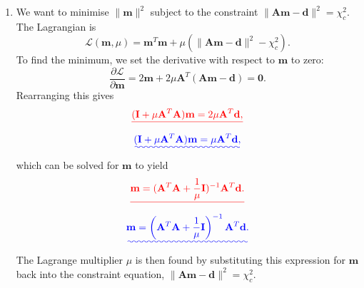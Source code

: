 \documentclass[a4paper,10pt]{paper}
\providecommand{\DIFadd}[1]{{\protect\color{blue}\uwave{#1}}} %
\providecommand{\DIFdel}[1]{{\protect\color{red}\sout{#1}}}                      %
\providecommand{\DIFaddbegin}{} %
\providecommand{\DIFaddend}{} %
\providecommand{\DIFdelbegin}{} %
\providecommand{\DIFdelend}{} %
\begin{document}
\begin{enumerate}
\begin{enumerate}
    \item We want to minimise $\|\mathbf{m}\|^{2}$ subject to the constraint $\|\mathbf{A}\mathbf{m}-\mathbf{d}\|^{2} = \chi^{2}_{c}$. The Lagrangian is
    \begin{equation*}
        \mathcal{L}(\mathbf{m},\mu)=\mathbf{m}^{T}\mathbf{m}+\mu(\|\mathbf{A}\mathbf{m}-\mathbf{d}\|^{2}-\chi^{2}_{c}).
    \end{equation*}
    To find the minimum, we set the derivative with respect to $\mathbf{m}$ to zero:
    \begin{equation*}
        \frac{\partial\mathcal{L}}{\partial\mathbf{m}} = 2\mathbf{m}+2\mu\mathbf{A}^{T}(\mathbf{A}\mathbf{m}-\mathbf{d}) = \mathbf{0}.
    \end{equation*}
    Rearranging this gives
    \DIFdelbegin \begin{displaymath}
        \DIFdel{(\mathbf{I}+\mu\mathbf{A}^{T}\mathbf{A})\mathbf{m}=2\mu\mathbf{A}^{T}\mathbf{d},
    }\end{displaymath}%
\DIFdelend \DIFaddbegin \begin{equation*}
        \DIFadd{(\mathbf{I}+\mu\mathbf{A}^{T}\mathbf{A})\mathbf{m}=\mu\mathbf{A}^{T}\mathbf{d},
    }\end{equation*}\DIFaddend 
    which can be solved for $\mathbf{m}$ to yield
    \DIFdelbegin \begin{displaymath}
        \DIFdel{\mathbf{m}=( \mathbf{A}^{T}\mathbf{A} + \frac{1}{\mu}\mathbf{I})^{-1}\mathbf{A}^{T}\mathbf{d}.
    }\end{displaymath}%
\DIFdelend \DIFaddbegin \begin{equation*}
        \DIFadd{\mathbf{m}=\left( \mathbf{A}^{T}\mathbf{A} + \frac{1}{\mu}\mathbf{I}\right)^{-1}\mathbf{A}^{T}\mathbf{d}.
    }\end{equation*}\DIFaddend 
    The Lagrange multiplier $\mu$ is then found by substituting this expression for $\mathbf{m}$ back into the constraint equation, $\|\mathbf{A}\mathbf{m}-\mathbf{d}\|^{2} = \chi^{2}_{c}$.


\end{enumerate}
\end{enumerate}
\end{document}
